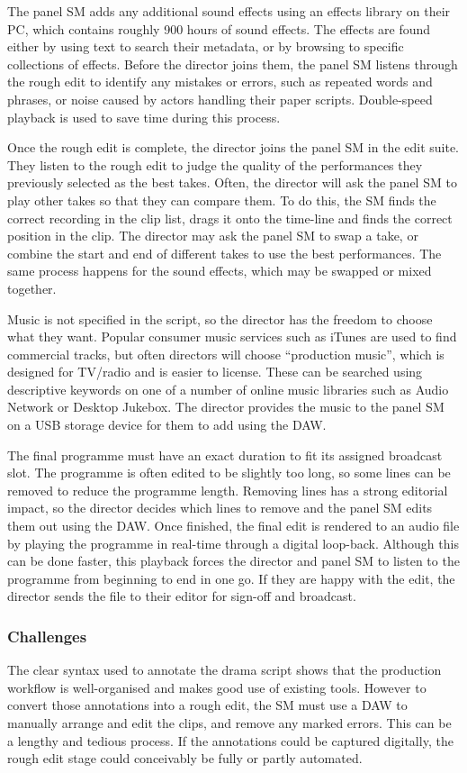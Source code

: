 The panel SM adds any additional sound effects using an effects library on their PC, which contains roughly 900 hours
of sound effects.  The effects are found either by using text to search their metadata, or by browsing to specific
collections of effects.  Before the director joins them, the panel SM listens through the rough edit to identify any
mistakes or errors, such as repeated words and phrases, or noise caused by actors handling their paper scripts.
Double-speed playback is used to save time during this process.

Once the rough edit is complete, the director joins the panel SM in the edit suite. They listen to the rough edit
to judge the quality of the performances they previously selected as the best takes.  Often, the director will ask the
panel SM to play other takes so that they can compare them.  To do this, the SM finds the correct recording in the clip
list, drags it onto the time-line and finds the correct position in the clip.  The director may ask the panel SM to swap
a take, or combine the start and end of different takes to use the best performances.  The same process happens for the
sound effects, which may be swapped or mixed together.

Music is not specified in the script, so the director has the freedom to choose what they want. Popular consumer music
services such as iTunes are used to find commercial tracks, but often directors will choose ``production music'', which
is designed for TV/radio and is easier to license. These can be searched using descriptive keywords on one of a
number of online music libraries such as Audio Network or Desktop Jukebox.  The director provides the music to the
panel SM on a USB storage device for them to add using the DAW.

The final programme must have an exact duration to fit its assigned broadcast slot. The programme is often edited to be
slightly too long, so some lines can be removed to reduce the programme length. Removing lines has a strong
editorial impact, so the director decides which lines to remove and the panel SM edits them out using the DAW.  Once
finished, the final edit is rendered to an audio file by playing the programme in real-time through a digital
loop-back. Although this can be done faster, this playback forces the director and panel SM to listen to the programme
from beginning to end in one go. If they are happy with the edit, the director sends the file to their editor for
sign-off and broadcast.

\subsubsection{Challenges}
The clear syntax used to annotate the drama script shows that the production workflow is well-organised and makes good
use of existing tools. However to convert those annotations into a rough edit, the SM must use a DAW to manually
arrange and edit the clips, and remove any marked errors. This can be a lengthy and tedious process. If the annotations
could be captured digitally, the rough edit stage could conceivably be fully or partly automated.

